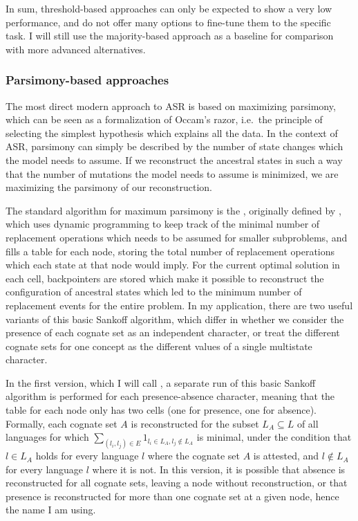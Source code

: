 \newpage 
In sum, threshold-based approaches can only be expected to show a very low performance, and do not offer many options to fine-tune them to the specific task. I will still use the majority-based approach as a baseline for comparison with more advanced alternatives.

\subsubsection{Parsimony-based approaches}
The most direct modern approach to ASR is based on maximizing parsimony, which can be seen as a formalization of Occam's razor, i.e.\ the principle of selecting the simplest hypothesis which explains all the data. In the context of ASR, parsimony can simply be described by the number of state changes which the model needs to assume. If we reconstruct the ancestral states in such a way that the number of mutations the model needs to assume is minimized, we are maximizing the parsimony of our reconstruction.

The standard algorithm for maximum parsimony is the , originally defined by \cite{sankoff1972}, which uses dynamic programming to keep track of the minimal number of replacement operations which needs to be assumed for smaller subproblems, and fills a table for each node, storing the total number of replacement operations which each state at that node would imply. For the current optimal solution in each cell, backpointers are stored which make it possible to reconstruct the configuration of ancestral states which led to the minimum number of replacement events for the entire problem. In my application, there are two useful variants of this basic Sankoff algorithm, which differ in whether we consider the presence of each cognate set as an independent character, or treat the different cognate sets for one concept as the different values of a single multistate character.

In the first version, which I will call \textit{}, a separate run of this basic Sankoff algorithm is performed for each presence-absence character, meaning that the table for each node only has two cells (one for presence, one for absence). Formally, each cognate set $A$ is reconstructed for the subset $L_A \subseteq L$ of all languages for which $\sum_{(l_i,l_j) \in E} 1_{l_i \in L_A, l_j \notin L_A}$ is minimal, under the condition that $l \in L_A$ holds for every language $l$ where the cognate set $A$ is attested, and $l \notin L_A$ for every language $l$ where it is not. In this version, it is possible that absence is reconstructed for all cognate sets, leaving a node without reconstruction, or that presence is reconstructed for more than one cognate set at a given node, hence the name I am using.

